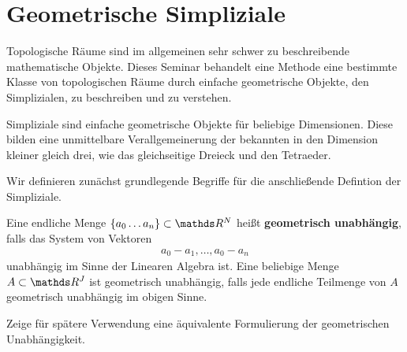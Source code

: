 





\section{Geometrische Simpliziale}

Topologische Räume sind im allgemeinen sehr schwer zu beschreibende
mathematische Objekte. Dieses Seminar behandelt eine Methode eine
bestimmte Klasse von topologischen Räume durch einfache geometrische
Objekte, den Simplizialen, zu beschreiben und zu verstehen.

Simpliziale sind einfache geometrische Objekte für beliebige
Dimensionen. Diese bilden eine unmittelbare Verallgemeinerung der
bekannten in den Dimension kleiner gleich drei, wie das gleichseitige
Dreieck und den Tetraeder.

Wir definieren zunächst grundlegende Begriffe für die anschließende
Defintion der Simpliziale.

\begin{Def}
  \label{def:1}
  Eine endliche Menge $\{ a_0\ldots a_n \} \subset \R^N$ heißt
  \textbf{geometrisch unabhängig}, falls das System von Vektoren
  \begin{gather*}
    a_0 - a_1 , \ldots , a_0 - a_n
  \end{gather*}
  unabhängig im Sinne der Linearen Algebra ist. Eine beliebige Menge
  $A \subset \R^J$ ist geometrisch unabhängig, falls jede endliche
  Teilmenge von $A$ geometrisch unabhängig im obigen Sinne.
\end{Def}

Zeige für spätere Verwendung eine äquivalente Formulierung der
geometrischen Unabhängigkeit.

